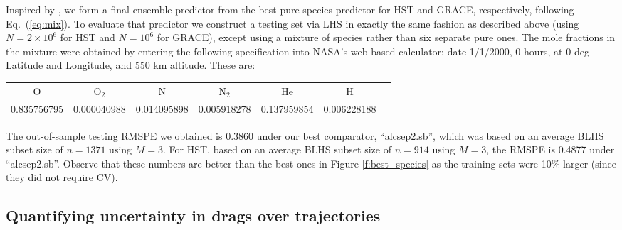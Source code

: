 \documentclass[12pt]{article}
\begin{document}
Inspired by \citet{metha:etal:2014}, we form a final ensemble predictor from
the best pure-species predictor for HST and GRACE, respectively, following
Eq.~(\ref{eq:mix}). To evaluate that predictor we construct a testing set via
LHS in exactly the same fashion as described above (using $N=2\times 10^6$ for
HST and $N=10^6$ for GRACE), except using a mixture of species rather
than six separate pure ones.  The mole fractions in the mixture were obtained
by entering the following specification into NASA's web-based calculator: date
1/1/2000, 0 hours, at 0 deg Latitude and Longitude, and 550 km altitude.  
These are:
\begin{center}
\begin{tabular}{ccccccc}
O & O$_2$ & N & N$_2$ & He & H \\
0.835756795 & 0.000040988 & 0.014095898 & 0.005918278 & 0.137959854 & 0.006228188 
\end{tabular}
\end{center}
The out-of-sample testing RMSPE we obtained is 0.3860 under our best
comparator, ``alcsep2.sb'', which was based on an average BLHS subset size of
$n=1371$ using $M=3$. For HST, based on an average BLHS subset size of $n=914$
using $M=3$, the RMSPE is 0.4877 under ``alcsep2.sb''.  Observe that these
numbers are better than the best ones in Figure \ref{f:best_species} as the
training sets were 10\% larger (since they did not require CV).

\subsection{Quantifying uncertainty in drags over trajectories}
\label{sec:satpath}
\end{document}
